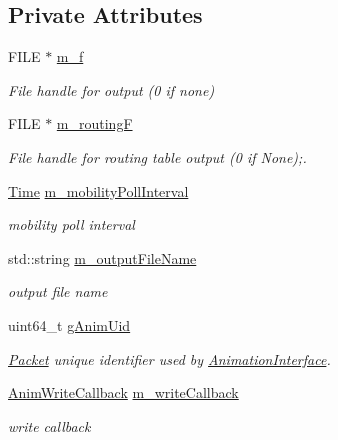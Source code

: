 \subsection*{Private Attributes}
\begin{DoxyCompactItemize}
\item 
F\+I\+LE $\ast$ \hyperlink{classns3_1_1AnimationInterface_a0185faff439edec3095ab22d1ada8aa5}{m\+\_\+f}
\begin{DoxyCompactList}\small\item\em File handle for output (0 if none) \end{DoxyCompactList}\item 
F\+I\+LE $\ast$ \hyperlink{classns3_1_1AnimationInterface_a51b17d826fa98c9854746dea46fa87f7}{m\+\_\+routingF}
\begin{DoxyCompactList}\small\item\em File handle for routing table output (0 if None);. \end{DoxyCompactList}\item 
\hyperlink{classns3_1_1Time}{Time} \hyperlink{classns3_1_1AnimationInterface_ae6cb45a110077b892accd3f3780c33b2}{m\+\_\+mobility\+Poll\+Interval}
\begin{DoxyCompactList}\small\item\em mobility poll interval \end{DoxyCompactList}\item 
std\+::string \hyperlink{classns3_1_1AnimationInterface_ab7cb00d1ae5a5ca92d0930abc91912de}{m\+\_\+output\+File\+Name}
\begin{DoxyCompactList}\small\item\em output file name \end{DoxyCompactList}\item 
uint64\+\_\+t \hyperlink{classns3_1_1AnimationInterface_a98ecb4d4c024e52171b3154f09b7bcc2}{g\+Anim\+Uid}
\begin{DoxyCompactList}\small\item\em \hyperlink{classns3_1_1Packet}{Packet} unique identifier used by \hyperlink{classns3_1_1AnimationInterface}{Animation\+Interface}. \end{DoxyCompactList}\item 
\hyperlink{classns3_1_1AnimationInterface_a91003c61e43e2d6cb6192a55d3d69796}{Anim\+Write\+Callback} \hyperlink{classns3_1_1AnimationInterface_aae26d5685c88fd3380d1e501c378a839}{m\+\_\+write\+Callback}
\begin{DoxyCompactList}\small\item\em write callback \end{DoxyCompactList}\item 

\end{DoxyCompactItemize}
